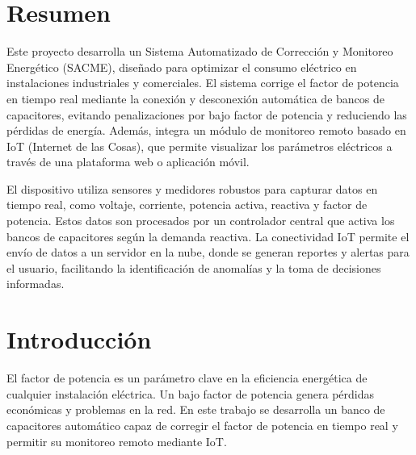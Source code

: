 \documentclass{report}          %
\newcommand{\fullname}      {Sistema Automatizado de Corrección y Monitoreo Energético (SACME)}
\begin{document}
    \clearpage  %

    \tableofcontents        %
    \thispagestyle{empty} %
    \listoffigures             %
    \thispagestyle{empty} %
    \listoftables              %
    \thispagestyle{empty} %
    \newpage

    \setcounter{page}{1}   %
    \chapter{Resumen}
        Este proyecto desarrolla un \fullname, diseñado para optimizar el consumo eléctrico en instalaciones industriales y comerciales. El sistema corrige el factor de potencia en tiempo real mediante la conexión y desconexión automática de bancos de capacitores, evitando penalizaciones por bajo factor de potencia y reduciendo las pérdidas de energía. Además, integra un módulo de monitoreo remoto basado en IoT (Internet de las Cosas), que permite visualizar los parámetros eléctricos a través de una plataforma web o aplicación móvil. \par
        El dispositivo utiliza sensores y medidores robustos para capturar datos en tiempo real, como voltaje, corriente, potencia activa, reactiva y factor de potencia. Estos datos son procesados por un controlador central que activa los bancos de capacitores según la demanda reactiva. La conectividad IoT permite el envío de datos a un servidor en la nube, donde se generan reportes y alertas para el usuario, facilitando la identificación de anomalías y la toma de decisiones informadas.

    \chapter{Introducción}
        El factor de potencia es un parámetro clave en la eficiencia energética de cualquier instalación eléctrica. Un bajo factor de potencia genera pérdidas económicas y problemas en la red. En este trabajo se desarrolla un banco de capacitores automático capaz de corregir el factor de potencia en tiempo real y permitir su monitoreo remoto mediante IoT.
        
\end{document}
